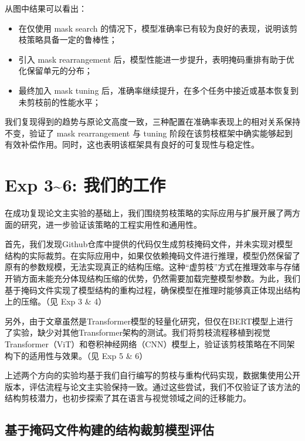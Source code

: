 \documentclass[UTF8,openany]{ctexbook}
\begin{document}
从图中结果可以看出：

\begin{itemize}[itemsep=0pt, topsep=0pt, parsep=0pt, partopsep=0pt]
    \item 在仅使用 mask search 的情况下，模型准确率已有较为良好的表现，说明该剪枝策略具备一定的鲁棒性；
    \item 引入 mask rearrangement 后，模型性能进一步提升，表明掩码重排有助于优化保留单元的分布；
    \item 最终加入 mask tuning 后，准确率继续提升，在多个任务中接近或基本恢复到未剪枝前的性能水平；
\end{itemize}

我们复现得到的趋势与原论文高度一致，三种配置在准确率表现上的相对关系保持不变，验证了 mask rearrangement 与 tuning 阶段在该剪枝框架中确实能够起到有效补偿作用。同时，这也表明该框架具有良好的可复现性与稳定性。

\section{Exp 3\textasciitilde 6: 我们的工作}

在成功复现论文主实验的基础上，我们围绕剪枝策略的实际应用与扩展开展了两方面的研究，进一步验证该策略的工程实用性和通用性。

首先，我们发现Github仓库中提供的代码仅生成剪枝掩码文件，并未实现对模型结构的实际裁剪。在实际应用中，如果仅依赖掩码文件进行推理，模型仍然保留了原有的参数规模，无法实现真正的结构压缩。这种“虚剪枝”方式在推理效率与存储开销方面未能充分体现结构压缩的优势，仍然需要加载完整模型参数。为此，我们基于掩码文件实现了模型结构的重构过程，确保模型在推理时能够真正体现出结构上的压缩。（见 Exp 3 \& 4）

另外，由于文章虽然是Transformer模型的轻量化研究，但仅在BERT模型上进行了实验，缺少对其他Transformer架构的测试。我们将剪枝流程移植到视觉Transformer\cite{dosovitskiy2020image}（ViT）和卷积神经网络\cite{fukushima1980neocognitron}（CNN）模型上，验证该剪枝策略在不同架构下的适用性与效果。（见 Exp 5 \& 6）

上述两个方向的实验均基于我们自行编写的剪枝与重构代码实现，数据集使用公开版本，评估流程与论文主实验保持一致。通过这些尝试，我们不仅验证了该方法的结构剪枝潜力，也初步探索了其在语言与视觉领域之间的迁移能力。

\subsection{基于掩码文件构建的结构裁剪模型评估}
\end{document}
